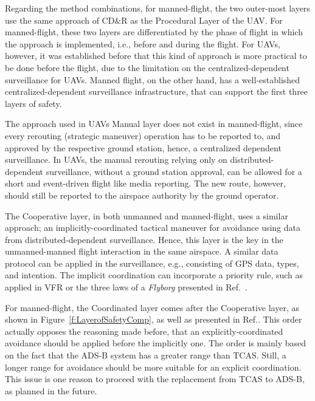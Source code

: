 Regarding the method combinations, for manned-flight, the two outer-most layers use the same approach of CD\&R as the Procedural Layer of the UAV. For manned-flight, these two layers are differentiated by the phase of flight in which the approach is implemented, i.e., before and during the flight. For UAVs, however, it was established before that this kind of approach is more practical to be done before the flight, due to the limitation on the centralized-dependent surveillance for UAVs. Manned flight, on the other hand, has a well-established centralized-dependent surveillance infrastructure, that can support the first three layers of safety. 

The approach used in UAVs Manual layer does not exist in manned-flight, since every rerouting (strategic maneuver) operation has to be reported to, and approved by the respective ground station, hence, a centralized dependent surveillance. In UAVs, the manual rerouting relying only on distributed-dependent surveillance, without a ground station approval, can be allowed for a short and event-driven flight like media reporting. The new route, however, should still be reported to the airspace authority by the ground operator. \cite{barfield:00}

The Cooperative layer, in both unmanned and manned-flight, uses a similar approach; an implicitly-coordinated tactical maneuver for avoidance using data from distributed-dependent surveillance. Hence, this layer is the key in the unmanned-manned flight interaction in the same airspace. A similar data protocol can be applied in the surveillance, e.g., consisting of GPS data, types, and intention. The implicit coordination can incorporate a priority rule, such as applied in VFR\cite{FAR:91} or the three laws of a \textit{Flyborg} presented in Ref.~\cite{barfield:00}. 

For manned-flight, the Coordinated layer comes after the Cooperative layer, as shown in Figure~\ref{f:LayerofSafetyComp}, as well as presented in Ref.\cite{Dalamagkidis:09}. This order actually opposes the reasoning made before, that an explicitly-coordinated avoidance should be applied before the implicitly one. The order is mainly based on the fact that the ADS-B system has a greater range than TCAS. Still, a longer range for avoidance should be more suitable for an explicit coordination. This issue is one reason to proceed with the replacement from TCAS to ADS-B, as planned in the future. %

